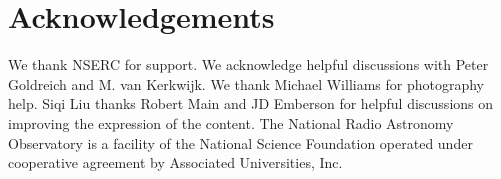 \documentclass[useAMS,usenatbib]{mn2e}
\begin{document}
\section{Acknowledgements}

We thank NSERC for support. We acknowledge helpful discussions with
Peter Goldreich and M. van Kerkwijk.  
We thank Michael Williams for photography help.  
Siqi Liu thanks Robert Main and JD Emberson for helpful discussions on
improving the expression of the content.  
The National Radio Astronomy Observatory is a facility of the National Science Foundation operated under cooperative agreement by Associated Universities, Inc.


\newcommand{\araa}{ARA\&A}   %
\newcommand{\afz}{Afz}       %
\newcommand{\aj}{AJ}         %
\newcommand{\azh}{AZh}       %
\newcommand{\aaa}{A\&A}      %
\newcommand{\aas}{A\&AS}     %
\newcommand{\aar}{A\&AR}     %
\newcommand{\apj}{ApJ}       %
\newcommand{\apjs}{ApJS}     %
\newcommand{\apjl}{ApJ}      %
\newcommand{\apss}{Ap\&SS}   %
\newcommand{\baas}{BAAS}     %
\newcommand{\jaa}{JA\&A}     %
\newcommand{\mnras}{MNRAS}   %
\newcommand{\nat}{Nat}       %
\newcommand{\pasj}{PASJ}     %
\newcommand{\pasp}{PASP}     %
\newcommand{\paspc}{PASPC}   %
\newcommand{\qjras}{QJRAS}   %
\newcommand{\sci}{Sci}       %
\newcommand{\solphys}{Solar Physics}       %
\newcommand{\sova}{SvA}      %
\newcommand{\aap}{A\&A}
\newcommand\jcap{{J. Cosmology Astropart. Phys.}}%
\newcommand{\prd}{Phys. Rev. D}






\label{lastpage}
\end{document}
